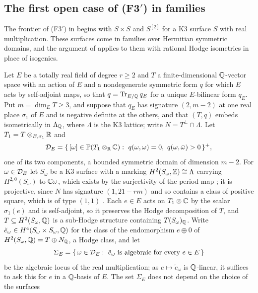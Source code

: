 \subsection{The first open case of (F3$'$) in families}\label{ssec:rmlocus}

The frontier of \textup{(F3$'$)} in  begins with
$S\times S$ and $S^{[2]}$ for a K3 surface $S$ with real multiplication. These
surfaces come in families over Hermitian symmetric domains, and the argument
of  applies to them with rational Hodge isometries in place of
isogenies.

\begin{setupenv}\label{setup:rm}
\enlargethispage{2pt}%
Let $E$ be a totally real field of degree $r\ge2$ and $T$ a finite-dimensional
$\mathbb{Q}$-vector space with an action of $E$ and a nondegenerate symmetric form
$q$ for which $E$ acts by self-adjoint maps, so that $q=\operatorname{Tr}_{E/\mathbb{Q}}q_{E}$ for
a unique $E$-bilinear form $q_{E}$. Put $m=\dim_{E}T\ge3$, and suppose that
$q_{E}$ has signature $(2,m-2)$ at one real place $\sigma_{1}$ of $E$ and is
negative definite at the others, and that $(T,q)$ embeds isometrically in
$\Lambda_{\mathbb{Q}}$, where $\Lambda$ is the K3 lattice; write
$N=T^{\perp}\cap\Lambda$. Let $T_{1}=T\otimes_{E,\sigma_{1}}\mathbb{R}$ and
\[
  \cD_{E}=\{\,[\omega]\in\PP(T_{1}\otimes_{\RR}\CC):\ q(\omega,\omega)=0,\
  q(\omega,\bar\omega)>0\,\}^{+},
\]
one of its two components, a bounded symmetric domain of dimension $m-2$. For
$\omega\in\mathcal{D}_{E}$ let $S_{\omega}$ be a K3 surface with a marking
$H^{2}(S_{\omega},\mathbb{Z})\cong\Lambda$ carrying $H^{2,0}(S_{\omega})$ to
$\mathbb{C}\omega$, which exists by the surjectivity of the period map
\cite[Chs.~6--7]{Huy16}; it is projective, since $N$ has signature
$(1,21-rm)$ and so contains a class of positive square, which is of type
$(1,1)$ \cite[Ch.~8]{Huy16}. Each $e\in E$ acts on
$T_{1}\otimes\mathbb{C}$ by the scalar $\sigma_{1}(e)$ and is self-adjoint, so it
preserves the Hodge decomposition of $T$, and $T\subseteq H^{2}(S_{\omega},\mathbb{Q})$
is a sub-Hodge structure containing $T(S_{\omega})_{\mathbb{Q}}$. Write
$\tilde e_{\omega}\in H^{4}(S_{\omega}\times S_{\omega},\mathbb{Q})$ for the class of
the endomorphism $e\oplus0$ of $H^{2}(S_{\omega},\mathbb{Q})=T\oplus N_{\mathbb{Q}}$, a
Hodge class, and let
\[
  \Sigma_{E}=\{\,\omega\in\mathcal{D}_{E}:\ \tilde e_{\omega}\ \text{is algebraic
  for every}\ e\in E\,\}
\]
be the algebraic locus of the real multiplication; as $e\mapsto\tilde
e_{\omega}$ is $\mathbb{Q}$-linear, it suffices to ask this for $e$ in a $\mathbb{Q}$-basis
of $E$. The set $\Sigma_{E}$ does not depend on the choice of the surfaces

\end{setupenv}

